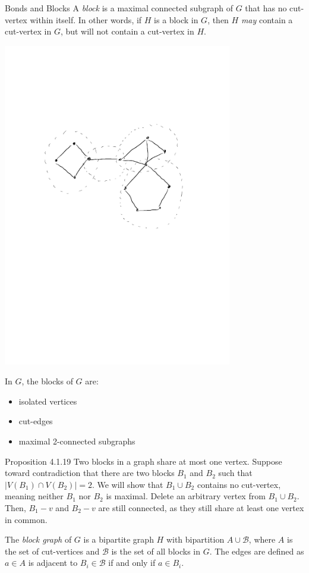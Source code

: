 \documentclass[10pt]{extarticle}
\begin{document}
\begin{problem}{Bonds and Blocks}
    A \textit{block} is a maximal connected subgraph of $G$ that has no cut-vertex within itself. In other words, if $H$ is a block in $G$, then $H$ \textit{may} contain a cut-vertex in $G$, but will not contain a cut-vertex in $H$. 
    \begin{center}
      \includegraphics[width=10cm]{blocks}
    \end{center}
    In $G$, the blocks of $G$ are:
    \begin{itemize}
      \item isolated vertices
      \item cut-edges
      \item maximal 2-connected subgraphs
    \end{itemize}
    \begin{problem}{Proposition 4.1.19}
      Two blocks in a graph share at most one vertex.
      \tcblower
      Suppose toward contradiction that there are two blocks $B_1$ and $B_2$ such that $|V(B_1) \cap V(B_2)| = 2$. We will show that $B_1\cup B_2$ contains no cut-vertex, meaning neither $B_1$ nor $B_2$ is maximal. Delete an arbitrary vertex from $B_1 \cup B_2$. Then, $B_1 - v$ and $B_2 - v$ are still connected, as they still share at least one vertex in common.
    \end{problem}
    The \textit{block graph} of $G$ is a bipartite graph $H$ with bipartition $A\cup \mathcal{B}$, where $A$ is the set of cut-vertices and $\mathcal{B}$ is the set of all blocks in $G$. The edges are defined as $a\in A$ is adjacent to $B_i\in \mathcal{B}$ if and only if $a\in B_i$.\\


\end{problem}
\end{document}
